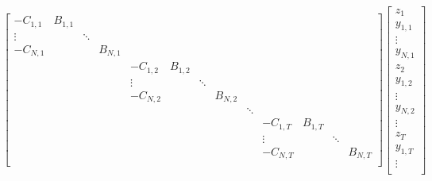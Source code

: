 \documentclass[11pt]{article} %
\begin{document}
\begin{align}  
    \begin{bmatrix}
        -C_{1,1} & B_{1,1} &         &         &         &         &         &         &         &         &         &         &\\
        \vdots  &         & \ddots  &         &         &         &         &         &         &         &         &         &\\
        -C_{N,1} &         &         & B_{N,1} &         &         &         &         &         &         &         &         &\\
                &         &         &         & -C_{1,2} & B_{1,2} &         &         &         &         &         &         &\\
                &         &         &         & \vdots  &         & \ddots  &         &         &         &         &         &\\
                &         &         &         & -C_{N,2} &         &         & B_{N,2} &         &         &         &         &\\
                &         &         &         &         &         &         &         & \ddots  &         &         &         &\\
                &         &         &         &         &         &         &         &         & -C_{1,T} & B_{1,T} &         &\\
                &         &         &         &         &         &         &         &         & \vdots  &         & \ddots  &\\
                &         &         &         &         &         &         &         &         & -C_{N,T} &         &         & B_{N,T}\\
    \end{bmatrix}
    \begin{bmatrix}
        z_{1}\\
        y_{1,1}\\
        \vdots \\
        y_{N,1} \\
        z_{2}\\
        y_{1,2}\\
        \vdots \\
        y_{N,2} \\
        \vdots \\
        z_{T}\\
        y_{1,T}\\
        \vdots \\

\end{bmatrix}
\end{align}
\end{document}
